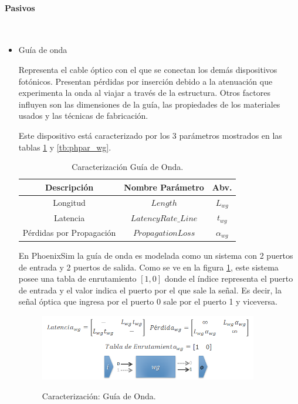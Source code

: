\paragraph{Pasivos}~\\
\begin{itemize}
\item Guía de onda

Representa el cable óptico con el que se conectan los demás dispositivos fotónicos. 
Presentan pérdidas por inserción debido a la atenuación que experimenta la onda
al viajar a través de la estructura. Otros factores influyen son 
las dimensiones de la guía, las propiedades de los materiales usados y las técnicas
de fabricación.

Este dispositivo está caracterizado por los 3 parámetros  mostrados en 
las tablas \ref{tb:wg_params} y \ref{tb:phpar_wg}.

\begin{table}[H]
\centering
\begin{tabular}{|c|c|c|}
\hline
Descripción &  Nombre Parámetro & Abv. \\
\hline
Longitud & $Length$ & $L_{wg}$ \\
Latencia & $LatencyRate\_Line$ & $t_{wg}$ \\
Pérdidas por Propagación & $PropagationLoss$ & $\alpha_{wg}$ \\
\hline
\end{tabular}
\caption{Caracterización Guía de Onda.}
\label{tb:wg_params}
\end{table} 

En PhoenixSim la guía de onda es modelada como un sistema con 2 puertos de entrada
y 2 puertos de salida. Como se ve en la figura \ref{fig:phoenix_wg}, este sistema
posee una tabla de enrutamiento $[1,0]$ donde el índice representa el puerto de entrada
y el valor indica el puerto por el que sale la señal. Es decir, la señal óptica que ingresa
por el puerto 0 sale por el puerto 1 y viceversa. \cite{Chan2011}

\begin{figure}[H]
\caption{Caracterización: Guía de Onda.}
\centering
\includegraphics[width=0.9\textwidth,natwidth=665,natheight=200]{figs/wg.png}
\label{fig:phoenix_wg}
\end{figure}


\end{itemize}
